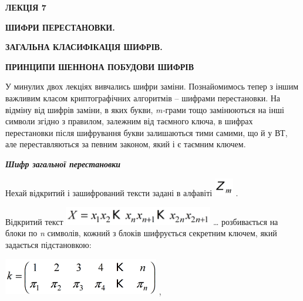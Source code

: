 \documentclass[a4paper]{article}
\newcounter{}
\begin{document}
\bigskip

{\bfseries
ЛЕКЦІЯ 7}


\bigskip

{\centering\bfseries
ШИФРИ  ПЕРЕСТАНОВКИ.
\par}

{\centering\bfseries
ЗАГАЛЬНА  КЛАСИФІКАЦІЯ  ШИФРІВ.
\par}

{\centering\bfseries
ПРИНЦИПИ  ШЕННОНА  ПОБУДОВИ  ШИФРІВ
\par}


\bigskip


\bigskip

У минулих двох лекціях вивчались шифри заміни. Познайомимось тепер з іншим
важливим класом криптографічних алгоритмів – шифрами перестановки. На відміну
від шифрів заміни, в яких букви, \textit{m}\textit{{}-}грами тощо замінюються
на інші символи згідно з правилом, залежним від таємного ключа, в шифрах
перестановки після шифрування букви залишаються тими самими, що й у ВТ, але
переставляються за певним законом, який і є таємним ключем. 


\bigskip

{\centering\bfseries\itshape
Шифр загальної  перестановки
\par}


\bigskip

Нехай відкритий і зашифрований тексти задані в алфавіті 
\includegraphics[width=0.3228in,height=0.3098in]{crypt-img/crypt-img55.png} .

Відкритий текст 
\includegraphics[width=2.5638in,height=0.3228in]{crypt-img/crypt-img56.png} …
розбивається на блоки по \textit{n }символів, кожний з блоків шифрується
секретним ключем, який задається підстановкою:

{\centering
 \includegraphics[width=2.678in,height=0.6244in]{crypt-img/crypt-img57.png} ,
\par}
\end{document}
